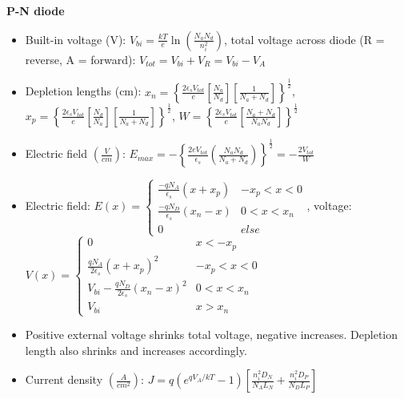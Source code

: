 \documentclass{article}
\begin{document}
\textbf{P-N diode}
\begin{itemize}
    \item Built-in voltage (V): $V_{bi} = \frac{kT}{e} \ln \left(\frac{N_a N_d}{n_i^2}\right)$, total voltage across diode (R = reverse, A = forward): $V_{tot} = V_{bi} + V_R = V_{bi} - V_A$
    \item Depletion lengths (cm): $x_n = \left\{\frac{2 \epsilon_s V_{tot}}{e}\left[\frac{N_a}{N_d}\right]\left[\frac{1}{N_a + N_d}\right]\right\}^{\frac{1}{2}}$, $x_p = \left\{\frac{2 \epsilon_s V_{tot}}{e}\left[\frac{N_d}{N_a}\right]\left[\frac{1}{N_a + N_d}\right]\right\}^{\frac{1}{2}}$, $W = \left\{\frac{2 \epsilon_s V_{tot}}{e}\left[\frac{N_a + N_d}{N_a N_d}\right]\right\}^{\frac{1}{2}}$
    \item Electric field $\left(\frac{V}{cm}\right)$: $E_{max} = -\left\{\frac{2e V_{tot}}{\epsilon_s}\left(\frac{N_a N_d}{N_a + N_d}\right)\right\}^{\frac{1}{2}} = -\frac{2 V_{tot}}{W}$
    \item Electric field: $E(x) = \begin{cases}
        \frac{-q N_A}{\epsilon_s}(x + x_p) & -x_p < x < 0 \\
        \frac{-q N_D}{\epsilon_s}(x_n - x) & 0 < x < x_n \\
        0 & else
    \end{cases}$,
    voltage: $V(x) = \begin{cases}
        0 & x < -x_p \\
        \frac{q N_A}{2 \epsilon_s}(x + x_p)^2 & -x_p < x < 0 \\
        V_{bi} - \frac{q N_D}{2 \epsilon_s}(x_n - x)^2 & 0 < x < x_n \\
        V_{bi} & x > x_n
    \end{cases}$
    \item Positive external voltage shrinks total voltage, negative increases. Depletion length also shrinks and increases accordingly.
    \item Current density $(\frac{A}{cm^2})$: $J = q\left(e^{q V_A / kT} - 1\right)\left[\frac{n_i^2 D_N}{N_A L_N} + \frac{n_i^2 D_P}{N_D L_P}\right]$
\end{itemize}
\end{document}
